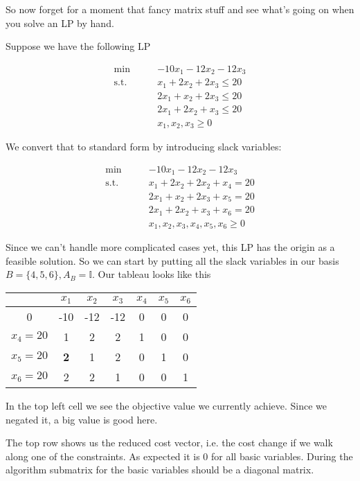 \begin{Ex} So now forget for a moment that fancy matrix stuff and see what's going on when you solve an LP by hand.

Suppose we have the following LP

\begin{align*}
\min \qquad& -10 x_1 - 12 x_2 - 12 x_3\\
\text{s.t.}\qquad & x_1 + 2 x_2 +2 x_3 \leq 20\\
& 2x_1 + x_2 + 2 x_3\leq 20\\
& 2x_1 + 2 x_2 + x_3\leq 20\\
& x_1,x_2,x_3 \geq 0
\end{align*}

We convert that to standard form by introducing slack variables:

\begin{align*}
\min \qquad 	  & -10 x_1 -12 x_2 -12 x_3 \\
\text{s.t.}\qquad & x_1 + 2 x_2 + 2 x_2 + x_4 = 20\\
		  & 2x_1 + x_2 + 2 x_3 + x_5  = 20\\
		  & 2 x_1 + 2 x_2 + x_3 + x_6 = 20\\
		  & x_1,x_2,x_3,x_4,x_5,x_6   \geq 0
\end{align*}

Since we can't handle more complicated cases yet, this LP has the origin as a feasible solution. So we can start by putting all the slack variables in our basis $B=\{4,5,6\}, A_B=\mathbb{I}$. Our tableau looks like this

\begin{center}
\begin{tabular}{c|cccccc}\label{tab:pivotExample}
  & $x_1$ & $x_2$ & $x_3$ & $x_4$ & $x_5$ & $x_6$ \\\hline
0 & -10 & -12 & -12 & 0 & 0 & 0\\\hline
$x_4=20$ & 1 & 2 & 2 & 1 &  0 & 0 \\
$x_5=20$ & {\bf 2} & 1 & 2 & 0 &  1 & 0\\
$x_6=20$ & 2 & 2 & 1 & 0 &  0 & 1\\
\end{tabular}
\end{center}

In the top left cell we see the objective value we currently achieve. Since we negated it, a big value is good here.

The top row shows us the reduced cost vector, i.e. the cost change if we walk along one of the constraints. As expected it is 0 for all basic variables. During the algorithm submatrix for the basic variables should be a diagonal matrix. 


\end{Ex}
